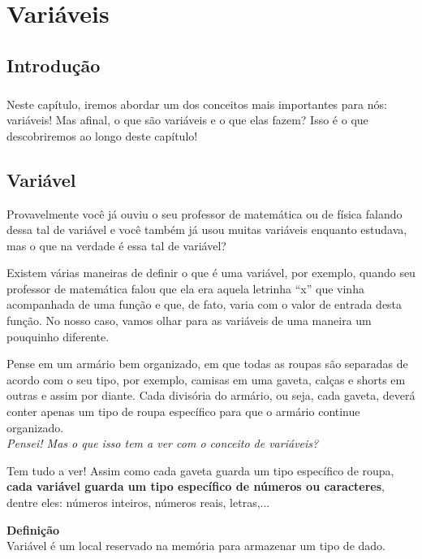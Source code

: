 \chapter{Variáveis}
\section*{Introdução}
\paragraph{}
    Neste capítulo, iremos abordar um dos conceitos mais importantes para nós: variáveis! 
    Mas afinal, o que são variáveis e o que elas fazem? Isso é o que descobriremos ao longo deste capítulo!
    
\section{Variável}
    Provavelmente você já ouviu o seu professor de matemática ou de física falando dessa tal de variável e você também já usou muitas variáveis enquanto estudava, mas o que na verdade é essa tal de variável? \par
    Existem várias maneiras de definir o que é uma variável, por exemplo, quando seu professor de matemática falou que ela era aquela letrinha ``x'' que vinha acompanhada de uma função e que, de fato, varia com o valor de entrada desta função. No nosso caso, vamos olhar para as variáveis de uma maneira um pouquinho diferente.  \par
    Pense em um armário bem organizado, em que todas as roupas são separadas de acordo com o seu tipo, por exemplo, camisas em uma gaveta, calças e shorts em outras e assim por diante. Cada divisória do armário, ou seja, cada gaveta, deverá conter apenas um tipo de roupa específico para que o armário continue organizado. \\
    
    \textit{Pensei! Mas o que isso tem a ver com o conceito de variáveis?} \par
    Tem tudo a ver! Assim como cada gaveta guarda um tipo específico de roupa, \textbf{cada variável guarda um tipo específico de números ou caracteres}, dentre eles: números inteiros, números reais, letras,...
    
\begin{center}
    \textbf{Definição} \\
    Variável é um local reservado na memória para armazenar um tipo de dado. 
\end{center}
    
